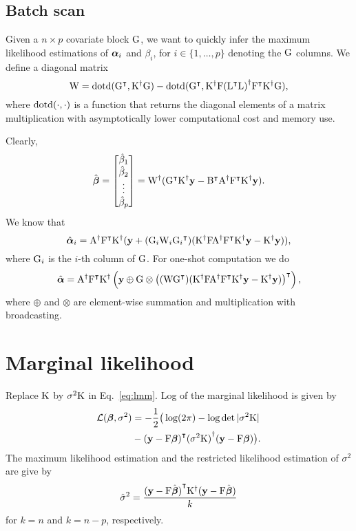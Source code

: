 \documentclass[twocolumn,draft]{article}
\begin{document}
\subsection{Batch scan}

Given a $n\times p$ covariate block $\mathrm{G}$, we want to quickly infer the
maximum likelihood estimations of $\boldsymbol{\alpha}_i$ and $\beta_i$, for
$i \in \{1, \dots, p\}$ denoting the $\mathrm{G}$ columns.
We define a diagonal matrix
\begin{equation*}
	\mathrm{W} = \mathrm{dotd} ({\mathrm{G}}^\intercal, {\mathrm{K}}^{\dagger}\mathrm{G}) -
	       \mathrm{dotd} ({\mathrm{G}}^\intercal, {\mathrm{K}}^{\dagger}\mathrm{F}
				 {({\mathrm{L}}^\intercal\mathrm{L})}^{\dagger}{\mathrm{F}}^\intercal{\mathrm{K}}^{\dagger}\mathrm{G}),
\end{equation*}
where $\mathrm{dotd} (\cdot, \cdot)$ is a function that returns the diagonal elements
of a matrix multiplication with asymptotically lower computational cost and
memory use.

Clearly,
\begin{equation*}
	\hat{\boldsymbol{\beta}} =
	\begin{bmatrix}
		\hat\beta_1 \\
		\hat\beta_2 \\
		\vdots \\
		\hat\beta_p
	\end{bmatrix}
	= {\mathrm{W}}^{\dagger}({\mathrm{G}}^\intercal{\mathrm{K}}^{\dagger}\mathbf{y}
	-{\mathrm{B}}^\intercal{\mathrm{A}}^{\dagger}{\mathrm{F}}^\intercal{\mathrm{K}}^{\dagger}\mathbf{y}).
\end{equation*}
We know that
\begin{equation*}
	\hat{\boldsymbol{\alpha}}_i = {\mathrm{A}}^{\dagger}{\mathrm{F}}^\intercal{\mathrm{K}}^{\dagger}
	(\mathbf{y} + (\mathrm{G}_i \mathrm{W}_i {\mathrm{G}_i}^\intercal)
	({\mathrm{K}}^{\dagger}\mathrm{F}{\mathrm{A}}^{\dagger}{\mathrm{F}}^\intercal{\mathrm{K}}^{\dagger}\mathbf{y} - {\mathrm{K}}^{\dagger}\mathbf{y})),
\end{equation*}
where $\mathrm{G}_i$ is the $i$-th column of $\mathrm{G}$.
For one-shot computation we do
\begin{equation*}
	\hat{\boldsymbol{\alpha}} = {\mathrm{A}}^{\dagger}{\mathrm{F}}^\intercal{\mathrm{K}}^{\dagger}
	\left(\mathbf{y} \oplus \mathrm{G} \otimes
	{\left((\mathrm{W}{\mathrm{G}}^\intercal)
	  ({\mathrm{K}}^{\dagger}\mathrm{F}{\mathrm{A}}^{\dagger}{\mathrm{F}}^\intercal{\mathrm{K}}^{\dagger}\mathbf{y}- {\mathrm{K}}^{\dagger}\mathbf{y})\right)}^\intercal\right),
\end{equation*}
where $\oplus$ and $\otimes$ are element-wise summation and multiplication
with broadcasting.

\section{Marginal likelihood}

Replace $\mathrm{K}$ by $\sigma^2\mathrm{K}$ in Eq.~\eqref{eq:lmm}.
Log of the marginal likelihood is given by
\begin{align*}
  \mathcal{L}(\boldsymbol{\beta}, \sigma^2) &=
	-\frac{1}{2}\big(\log(2\pi) - \log\det|\sigma^2\mathrm{K}| \\
	&- {(\mathbf{y} - \mathrm{F}\boldsymbol{\beta})}^\intercal {(\sigma^2\mathrm{K})}^{\dagger} (\mathbf{y} - \mathrm{F}\boldsymbol{\beta})
	\big).
\end{align*}
The maximum likelihood estimation and the restricted likelihood estimation of
$\sigma^2$ are give by
\begin{equation*}
	\hat\sigma^2 = \frac{
		{(\mathbf{y} - \mathrm{F}\hat{\boldsymbol{\beta}})}^\intercal
			{\mathrm{K}}^{\dagger}
		(\mathbf{y} - \mathrm{F}\hat{\boldsymbol{\beta}})
	}{k}
\end{equation*}
for $k = n$ and $k = n - p$, respectively.
\end{document}
